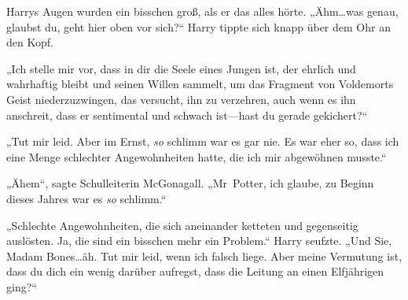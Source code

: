 Harrys Augen wurden ein bisschen groß, als er das alles hörte.
„Ähm…was genau, glaubst du, geht hier oben vor sich?“
Harry tippte sich knapp über dem Ohr an den Kopf.

„Ich stelle mir vor, dass in dir die Seele eines Jungen ist, der ehrlich und wahrhaftig bleibt und seinen Willen sammelt, um das Fragment von Voldemorts Geist niederzuzwingen, das versucht, ihn zu verzehren, auch wenn es ihn anschreit, dass er sentimental und schwach ist—hast du gerade gekichert?“

„Tut mir leid. Aber im Ernst, \emph{so} schlimm war es gar nie. Es war eher so, dass ich eine Menge schlechter Angewohnheiten hatte, die ich mir abgewöhnen musste.“

„Ähem“, sagte Schulleiterin McGonagall. „Mr~Potter, ich glaube, zu Beginn dieses Jahres war es \emph{so} schlimm.“

„Schlechte Angewohnheiten, die sich aneinander ketteten und gegenseitig auslösten. Ja, die sind ein bisschen mehr ein Problem.“
Harry seufzte.
„Und Sie, Madam Bones…äh. Tut mir leid, wenn ich falsch liege. Aber meine Vermutung ist, dass du dich ein wenig darüber aufregst, dass die Leitung an einen Elfjährigen ging?“

